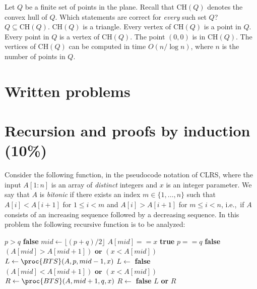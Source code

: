 Let $Q$ be a finite set of points in the plane.
Recall that $\text{CH}(Q)$ denotes the convex hull of $Q$.
Which statements are correct for \emph{every} such set $Q$?
\multipleanswers
\optionsstart
\answer $Q\subseteq\text{CH}(Q)$.\correct
\answer $\text{CH}(Q)$ is a triangle.
\answer Every vertex of $\text{CH}(Q)$ is a point in $Q$.\correct
\answer Every point in $Q$ is a vertex of $\text{CH}(Q)$.
\answer The point $(0,0)$ is in $\text{CH}(Q)$.
\answer The vertices of $\text{CH}(Q)$ can be computed in time $O(n/\log n)$, where $n$ is the number of points in $Q$.
\optionsend



\multiplechoiceend

\newpage

\section*{Written problems}\label{sec:written}



\section{Recursion and proofs by induction (10\%)}

Consider the following function, in the pseudocode notation of CLRS, where the input $A[1:n]$ is an array of \emph{distinct} integers and $x$ is an integer parameter.
We say that $A$ is \emph{bitonic} if there exists an index $m \in \{1,\dots,n\}$ such that $A[i] < A[i+1]$ for $1 \leq i < m$ and $A[i] > A[i+1]$ for $m\leq i < n$, i.e.,~if $A$ consists of an increasing sequence followed by a decreasing sequence.
In this problem the following recursive function is to be analyzed:

\begin{codebox}
\li \If $p > q$ \Return \textbf{false}
\li $mid \gets \lfloor (p+q)/2 \rfloor$
\li \If $A[mid] == x$ \Return \textbf{true}
\li \ElseIf $p==q$ \Return \textbf{false}
\li \If $(A[mid] > A[mid+1]) \textbf{ or } (x < A[mid])$
\li \Then $L \gets \proc{BTS}(A, p, mid-1, x)$
\li \Else $L \gets$ \textbf{false}\End
\li \If $(A[mid] < A[mid+1]) \textbf{ or } (x < A[mid])$
\li \Then $R \gets \proc{BTS}(A, mid+1, q, x)$
\li \Else $R \gets$ \textbf{false} \End
\li \Return $L$ \textbf{ or } $R$
\end{codebox}

